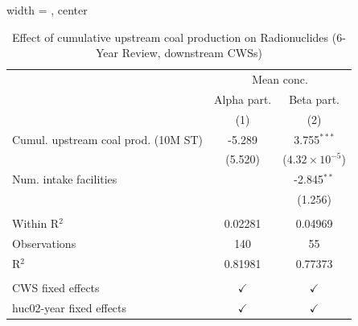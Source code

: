 
\begin{table}[htbp]
   
   \caption{\label{tab:6yr_huc02fe_radio} Effect of cumulative upstream coal production on Radionuclides (6-Year Review, downstream CWSs)}
   \bigskip
   
   \centering
   
   \begin{adjustbox}{width = \textwidth, center}
      
      
      \begin{tabular}{lcc}
         \toprule
         
          & \multicolumn{2}{c}{Mean conc.}\\
         
                                             & Alpha part.   & Beta part. \\   
         
                                             & (1)           & (2)\\  
         
         \midrule 
         Cumul. upstream coal prod. (10M ST) & -5.289        & 3.755$^{***}$\\   
                                             & (5.520)       & ($4.32\times 10^{-5}$)\\    
         Num. intake facilities              &               & -2.845$^{**}$\\   
                                             &               & (1.256)\\   
         
          \\
         
         Within R$^2$                        & 0.02281       & 0.04969\\  
         Observations                        & 140           & 55\\  
         R$^2$                               & 0.81981       & 0.77373\\  
         
          \\
         
         CWS fixed effects                   & $\checkmark$  & $\checkmark$\\   
         huc02-year fixed effects            & $\checkmark$  & $\checkmark$\\   
         

\end{tabular}
\end{adjustbox}
\end{table}
